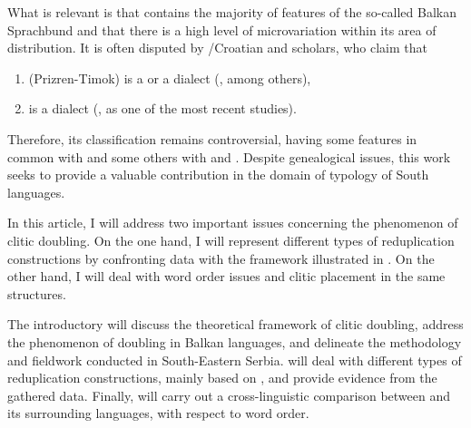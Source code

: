 \documentclass[output=paper,
colorlinks,
citecolor=brown,
newtxmath
]{langscibook}
\begin{document}
What is relevant is that  contains the majority of features of the so-called Balkan Sprachbund and that there is a high level of microvariation within its area of distribution. It is often disputed by /Croatian and  scholars, who claim that

\begin{enumerate}
\item {} (Prizren-Timok) is a  or a  dialect (\citealt{Belic1905,Ivic1956,Brozovic.Ivic1988}, among others),
\item {} is a  dialect (\citealt{Stoykov2002}, as one of the most recent studies).
\end{enumerate}

Therefore, its classification remains controversial, having some features in common with  and some others with  and . Despite genealogical issues, this work seeks to provide a valuable contribution in the domain of typology of South  languages.


In this article, I will address two important issues concerning the phenomenon of clitic doubling. On the one hand, I will represent different types of reduplication constructions by confronting  data with the framework illustrated in \citet{Cinque.Krapova2008}. On the other hand, I will deal with word order issues and clitic placement in the same structures.

The introductory   will discuss the theoretical framework of clitic doubling, address the phenomenon of doubling in Balkan languages, and delineate the methodology and fieldwork conducted in South-Eastern Serbia.  will deal with different types of reduplication constructions, mainly based on \citet{Cinque.Krapova2008}, and provide evidence from the gathered data. Finally,  will carry out a cross-linguistic comparison between  and its surrounding languages, with respect to word order.
\end{document}

